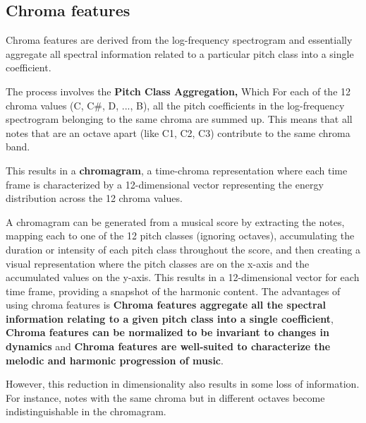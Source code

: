 \documentclass[a4paper, 9pt, twocolumn]{extarticle}
\begin{document}
\subsection{Chroma features}
Chroma features are derived from the log-frequency spectrogram
and essentially aggregate all spectral information related to a
particular pitch class into a single coefficient.

The process involves the \textbf{Pitch Class Aggregation,} Which For
each of the 12 chroma values (C, C\#, D, ..., B), all the pitch
coefficients in the log-frequency spectrogram belonging to the same
chroma are summed up. This means that all notes that are an octave apart
(like C1, C2, C3) contribute to the same chroma band.

This results in a \textbf{chromagram}, a time-chroma representation
where each time frame is characterized by a 12-dimensional vector
representing the energy distribution across the 12 chroma values.

A chromagram can be generated from a musical score by extracting
the notes, mapping each to one of the 12 pitch classes (ignoring octaves),
accumulating the duration or intensity of each pitch class
throughout the score, and then creating a visual representation
where the pitch classes are on the x-axis and the accumulated
values on the y-axis. 
This results in a 12-dimensional vector for each time frame, providing a snapshot of the harmonic content.
The advantages of using chroma features is \textbf{Chroma features
aggregate all the spectral information relating to a given pitch class into a single coefficient},
\textbf{Chroma features can be normalized to be invariant to
changes in dynamics} and
\textbf{Chroma features are well-suited to characterize the
melodic and harmonic progression of music}.


However, this reduction in dimensionality also results in some loss of
information. For instance, notes with the same chroma but in different
octaves become indistinguishable in the chromagram.
\end{document}
